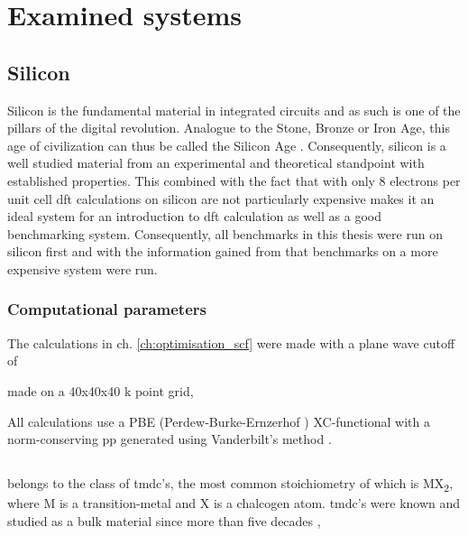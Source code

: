 \documentclass[main.tex]{subfiles}
\begin{document}
\chapter{Examined systems}\label{ch:examined_systems}

\section{Silicon}\label{sec:systems_silicon}

Silicon is the fundamental material in integrated circuits and as such is one of the pillars of the digital revolution.
Analogue to the Stone, Bronze or Iron Age, this age of civilization can thus be called the Silicon Age \cite{chabal_fundamental_2001}.
Consequently, silicon is a well studied material from an experimental and theoretical standpoint with established properties.
This combined with the fact that with only 8 electrons per unit cell \acrshort{dft} calculations on silicon are not particularly expensive makes it an ideal system for an introduction to \acrshort{dft} calculation as well as a good benchmarking system.
Consequently, all benchmarks in this thesis were run on silicon first and with the information gained from that benchmarks on a more expensive system were run.

\subsection{Computational parameters}

The calculations in ch. \ref{ch:optimisation_scf} were made with a plane wave cutoff of

made on a 40x40x40 k point grid, 

All calculations use a PBE (Perdew-Burke-Ernzerhof \cite{perdew_generalized_1996}) XC-functional with a norm-conserving \acrshort{pp} generated using Vanderbilt's method \cite{hamann_erratum_2017}.


\section{\TaS}\label{sec:systems_tas2}

\TaS belongs to the class of \acrfull{tmdc}'s, the most common stoichiometry of which is MX\textsubscript{2}, where M is a transition-metal and X is a chalcogen atom.
\acrshort{tmdc}'s were known and studied as a bulk material since more than five decades \cite{wilson_transition_1969}, 
\end{document}
